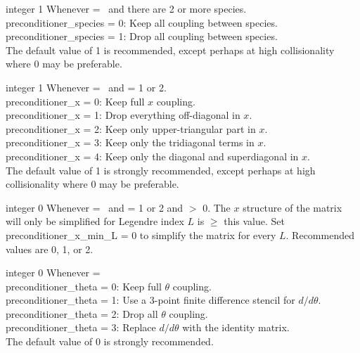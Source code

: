 \myhrule

{integer}
{1}
{Whenever  = \true~and there are 2 or more species.}
{\\
{\ttfamily preconditioner\_species} = 0: Keep all coupling between species.\\

{\ttfamily preconditioner\_species} = 1: Drop all coupling between species.\\

The default value of 1 is recommended, except perhaps at high collisionality where 0 may be preferable.}

\myhrule

{integer}
{1}
{Whenever  = \true~and  = 1 or 2.}
{\\
{\ttfamily preconditioner\_x} = 0: Keep full $x$ coupling.\\

{\ttfamily preconditioner\_x} = 1: Drop everything off-diagonal in $x$.\\

{\ttfamily preconditioner\_x} = 2: Keep only upper-triangular part in $x$.\\

{\ttfamily preconditioner\_x} = 3: Keep only the tridiagonal terms in $x$.\\

{\ttfamily preconditioner\_x} = 4: Keep only the diagonal and superdiagonal in $x$.\\

The default value of 1 is strongly recommended, except perhaps at high collisionality where 0 may be preferable.}

\myhrule

{integer}
{0}
{Whenever  = \true~and  = 1 or 2 and  $>$ 0.}
{The $x$ structure of the matrix will only be simplified for Legendre index $L$ is $\ge$ this value.
Set {\ttfamily preconditioner\_x\_min\_L} = 0 to simplify the matrix for every $L$.
Recommended values are 0, 1, or 2.}

\myhrule

{integer}
{0}
{Whenever  = \true}
{\\
{\ttfamily preconditioner\_theta} = 0: Keep full $\theta$ coupling.\\

{\ttfamily preconditioner\_theta} = 1: Use a 3-point finite difference stencil for $d/d\theta$.\\

{\ttfamily preconditioner\_theta} = 2: Drop all $\theta$ coupling.\\

{\ttfamily preconditioner\_theta} = 3: Replace $d/d\theta$ with the identity matrix.\\

The default value of 0 is strongly recommended.}

